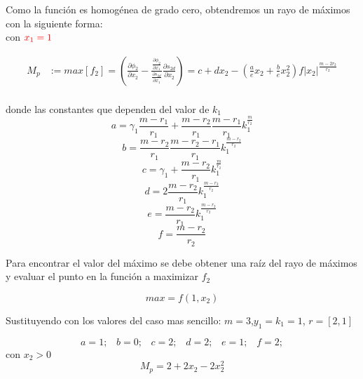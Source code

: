    Como la función es homogénea de grado cero, obtendremos un rayo de máximos con la siguiente forma:\\
      con $\textcolor{red}{x_1=1}$

      \begin{equation}
       \begin{split}
         M_p&:= max\left[f_2 \right]= \left(  \frac{\partial \phi_2}{\partial x_2} -  \frac{\frac{\partial \phi_2}{\partial x_1}}{\frac{\partial s_{2d}}{\partial x_1}}  \frac{\partial s_{2d}}{\partial x_2} \right) =c + d x_2 - \left( \frac{a}{e}  x_2 + \frac{b}{e} x_2^2 \right) f  |x_2|^{\frac{m-2r_2}{r_2}} \\
       \end{split}
     \end{equation}

     donde las constantes que dependen del valor de $k_1$
     \begin{equation}
       a=\gamma_1 \frac{m-r_1}{r_1} +\frac{m-r_2}{r_1} \frac{m-r_1}{r_1} k_1^{\frac{m}{r_2}}  
     \end{equation}
     \begin{equation}
       b=\frac{m-r_2}{r_1} \frac{m-r_2-r_1}{r_1} k_1^{\frac{m-r_2}{r_2}}
     \end{equation}
     \begin{equation}
       c=\gamma_1 +\frac{m-r_2}{r_1}k_1^{\frac{m}{r_2}}
     \end{equation}
     \begin{equation}
       d=2\frac{m-r_2}{r_1} k_1^{\frac{m-r_2}{r_2}}
     \end{equation}
     \begin{equation}
       e=\frac{m-r_2}{r_1} k_1^{\frac{m-r_2}{r_2}}
     \end{equation}
     \begin{equation}
       f=\frac{m-r_2}{r_2}
     \end{equation}

     Para encontrar el valor del máximo se debe obtener una raíz del rayo de máximos y evaluar el punto en la función a maximizar $f_2$

     \begin{equation*}
       max= f(1,x_2)
     \end{equation*}

     Sustituyendo con los valores del caso mas sencillo:
      $m=3$,$ y_1=k_1=1$, $r=[2,1]$

      \begin{equation*}
       a=1;\;\;\;b=0;\;\;\;c=2;\;\;\;d=2;\;\;\;e=1;\;\;\;f=2;
      \end{equation*}
      con $x_2>0$
     \begin{equation}
       M_p=2+2x_2-2x_2^2
     \end{equation}

